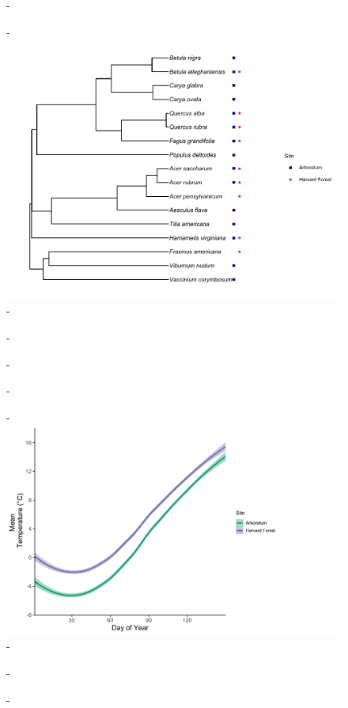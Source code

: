 \documentclass{article}\usepackage[]{graphicx}\usepackage[]{color}
\begin{document}
{\begin{figure} [H]
  -\begin{center}
  -\includegraphics[width=12cm]{..//phylodata/microtree_hfandts.pdf}
  -\caption{}\label{fig:phylo}
  -\end{center}
  -\end{figure}}
  
{\begin{figure} [H]
  -\begin{center}
  -\includegraphics[width=12cm]{..//analyses/figures/climate_hfandts.pdf}
  -\caption{}\label{fig:clim}
  -\end{center}
  -\end{figure}}
  
\end{document}
